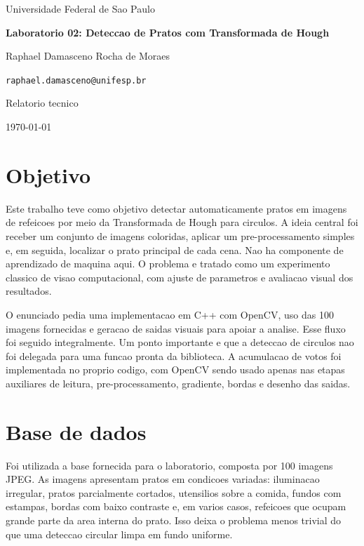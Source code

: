 \documentclass[12pt,a4paper]{article}
\makeatletter
\newcommand{\AuthorName}{Raphael Damasceno Rocha de Moraes}
\newcommand{\AuthorEmail}{raphael.damasceno@unifesp.br}
\makeatother
\begin{document}
\begin{titlepage}
    \centering
    {\large Universidade Federal de Sao Paulo\par}
    \vspace{1.2cm}
    {\Large\bfseries Laboratorio 02: Deteccao de Pratos com Transformada de Hough\par}
    \vspace{2.0cm}
    {\large \AuthorName\par}
    \vspace{0.2cm}
    {\normalsize \texttt{\AuthorEmail}\par}
    \vfill
    {\large Relatorio tecnico\par}
    \vspace{0.4cm}
    {\large \today\par}
\end{titlepage}

\section{Objetivo}

Este trabalho teve como objetivo detectar automaticamente pratos em imagens de refeicoes por meio da Transformada de Hough para circulos. A ideia central foi receber um conjunto de imagens coloridas, aplicar um pre-processamento simples e, em seguida, localizar o prato principal de cada cena. Nao ha componente de aprendizado de maquina aqui. O problema e tratado como um experimento classico de visao computacional, com ajuste de parametros e avaliacao visual dos resultados.

O enunciado pedia uma implementacao em C++ com OpenCV, uso das 100 imagens fornecidas e geracao de saidas visuais para apoiar a analise. Esse fluxo foi seguido integralmente. Um ponto importante e que a deteccao de circulos nao foi delegada para uma funcao pronta da biblioteca. A acumulacao de votos foi implementada no proprio codigo, com OpenCV sendo usado apenas nas etapas auxiliares de leitura, pre-processamento, gradiente, bordas e desenho das saidas.

\section{Base de dados}

Foi utilizada a base fornecida para o laboratorio, composta por 100 imagens JPEG. As imagens apresentam pratos em condicoes variadas: iluminacao irregular, pratos parcialmente cortados, utensilios sobre a comida, fundos com estampas, bordas com baixo contraste e, em varios casos, refeicoes que ocupam grande parte da area interna do prato. Isso deixa o problema menos trivial do que uma deteccao circular limpa em fundo uniforme.
\end{document}

